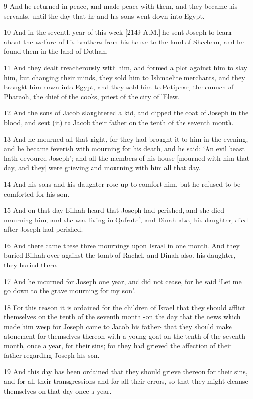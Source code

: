 \par 9 And he returned in peace, and made peace with them, and they became his servants, until the day that he and his sons went down into Egypt.
\par 10 And in the seventh year of this week [2149 A.M.] he sent Joseph to learn about the welfare of his brothers from his house to the land of Shechem, and he found them in the land of Dothan.
\par 11 And they dealt treacherously with him, and formed a plot against him to slay him, but changing their minds, they sold him to Ishmaelite merchants, and they brought him down into Egypt, and they sold him to Potiphar, the eunuch of Pharaoh, the chief of the cooks, priest of the city of 'Elew.
\par 12 And the sons of Jacob slaughtered a kid, and dipped the coat of Joseph in the blood, and sent (it) to Jacob their father on the tenth of the seventh month.
\par 13 And he mourned all that night, for they had brought it to him in the evening, and he became feverish with mourning for his death, and he said: ‘An evil beast hath devoured Joseph’; and all the members of his house [mourned with him that day, and they] were grieving and mourning with him all that day.
\par 14 And his sons and his daughter rose up to comfort him, but he refused to be comforted for his son.
\par 15 And on that day Bilhah heard that Joseph had perished, and she died mourning him, and she was living in Qafratef, and Dinah also, his daughter, died after Joseph had perished.
\par 16 And there came these three mournings upon Israel in one month. And they buried Bilhah over against the tomb of Rachel, and Dinah also. his daughter, they buried there.
\par 17 And he mourned for Joseph one year, and did not cease, for he said ‘Let me go down to the grave mourning for my son’.
\par 18 For this reason it is ordained for the children of Israel that they should afflict themselves on the tenth of the seventh month -on the day that the news which made him weep for Joseph came to Jacob his father- that they should make atonement for themselves thereon with a young goat on the tenth of the seventh month, once a year, for their sins; for they had grieved the affection of their father regarding Joseph his son.
\par 19 And this day has been ordained that they should grieve thereon for their sins, and for all their transgressions and for all their errors, so that they might cleanse themselves on that day once a year.
